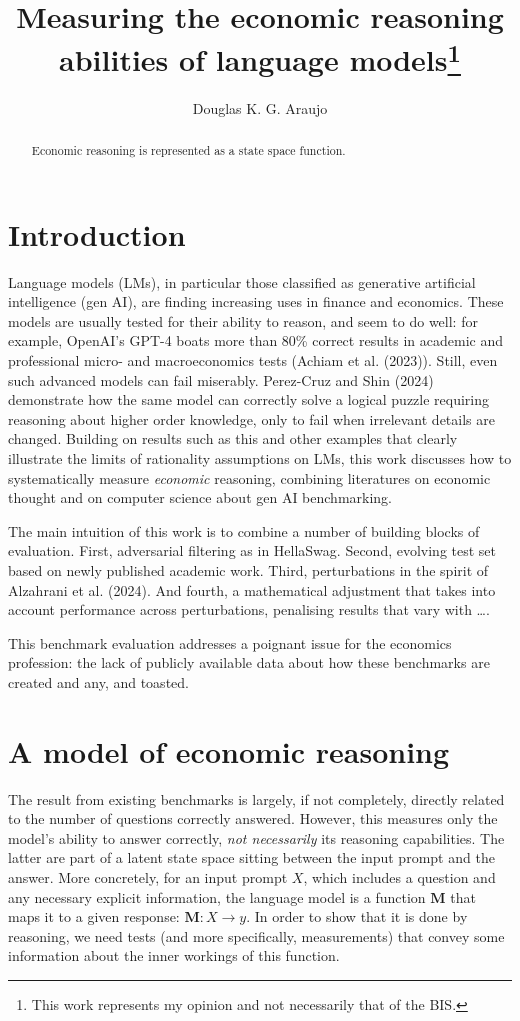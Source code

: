 \documentclass[
]{article}
\title{Measuring the economic reasoning abilities of language
models\thanks{This work represents my opinion and not necessarily that
of the BIS.}}
\author{Douglas K. G. Araujo}
\affil{%
                  Bank for International
Settlements, douglas.araujo@bis.org
              }
\date{}
\begin{document}
\maketitle
\begin{abstract}
Economic reasoning is represented as a state space function.
\end{abstract}

\section{Introduction}\label{introduction}

Language models (LMs), in particular those classified as generative
artificial intelligence (gen AI), are finding increasing uses in finance
and economics. These models are usually tested for their ability to
reason, and seem to do well: for example, OpenAI's GPT-4 boats more than
80\% correct results in academic and professional micro- and
macroeconomics tests (Achiam et al. (2023)). Still, even such advanced
models can fail miserably. Perez-Cruz and Shin (2024) demonstrate how
the same model can correctly solve a logical puzzle requiring reasoning
about higher order knowledge, only to fail when irrelevant details are
changed. Building on results such as this and other examples that
clearly illustrate the limits of rationality assumptions on LMs, this
work discusses how to systematically measure \emph{economic} reasoning,
combining literatures on economic thought and on computer science about
gen AI benchmarking.

The main intuition of this work is to combine a number of building
blocks of evaluation. First, adversarial filtering as in HellaSwag.
Second, evolving test set based on newly published academic work. Third,
perturbations in the spirit of Alzahrani et al. (2024). And fourth, a
mathematical adjustment that takes into account performance across
perturbations, penalising results that vary with \ldots.

This benchmark evaluation addresses a poignant issue for the economics
profession: the lack of publicly available data about how these
benchmarks are created and any, and toasted.

\section{A model of economic
reasoning}\label{a-model-of-economic-reasoning}

The result from existing benchmarks is largely, if not completely,
directly related to the number of questions correctly answered. However,
this measures only the model's ability to answer correctly, \emph{not
necessarily} its reasoning capabilities. The latter are part of a latent
state space sitting between the input prompt and the answer. More
concretely, for an input prompt \(X\), which includes a question and any
necessary explicit information, the language model is a function
\(\mathbf{M}\) that maps it to a given response:
\(\mathbf{M} : X \to y\). In order to show that it is done by reasoning,
we need tests (and more specifically, measurements) that convey some
information about the inner workings of this function.
\end{document}
